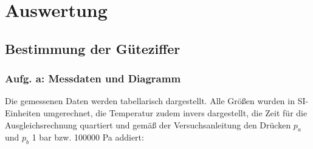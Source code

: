 \section{Auswertung}
\label{sec:Auswertung}

\subsection{Bestimmung der Güteziffer}

\subsubsection{Aufg. a: Messdaten und Diagramm}

Die gemessenen Daten werden tabellarisch dargestellt. Alle Größen wurden in SI-Einheiten umgerechnet, die Temperatur zudem invers dargestellt,
die Zeit für die Ausgleichsrechnung quartiert und gemäß der Versuchsanleitung \cite{v206} den Drücken $\textit{p}_\textit{a}$ und $\textit{p}_\textit{b}$ 1 bar bzw. 100000 Pa addiert:

